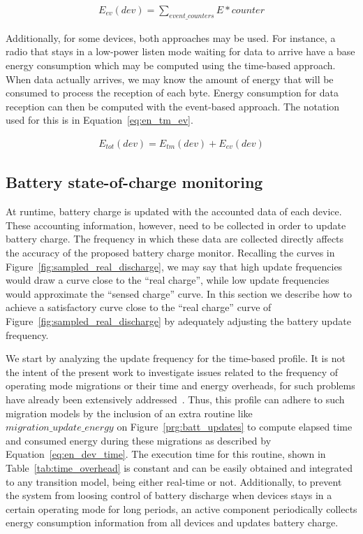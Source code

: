 \begin{eqnarray}
E_{ev}(dev) = \sum_{event\_counters} E * counter \label{eq:en_dev_ev}
\end{eqnarray}

Additionally, for some devices, both approaches may be used. For instance, a
radio that stays in a low-power listen mode waiting for data to arrive have a
base energy consumption which may be computed using the time-based approach.
When data actually arrives, we may know the amount of energy that will be
consumed to process the reception of each byte. Energy consumption for data
reception can then be computed with the event-based approach. The notation used
for this is in Equation~\ref{eq:en_tm_ev}.

\begin{eqnarray}
E_{tot}(dev) = E_{tm}(dev) + E_{ev}(dev) \label{eq:en_tm_ev}
\end{eqnarray}


\subsection{Battery state-of-charge monitoring}

At runtime, battery charge is updated with the accounted data of each device.
These accounting information, however, need to be collected in order to update
battery charge. The frequency in which these data are collected directly affects
the accuracy of the proposed battery charge monitor. Recalling the curves in
Figure~\ref{fig:sampled_real_discharge}, we may say that high update frequencies
would draw a curve close to the ``real charge'', while low update frequencies
would approximate the ``sensed charge'' curve. In this section we describe how
to achieve a satisfactory curve close to the ``real charge'' curve of
Figure~\ref{fig:sampled_real_discharge} by adequately adjusting the battery
update frequency.

We start by analyzing the update frequency for the time-based profile. It is not
the intent of the present work to investigate issues related to the frequency of
operating mode migrations or their time and energy overheads, for such problems
have already been extensively addressed~\cite{Hoeller:DIPES:2006,Seo:2011}.
Thus, this profile can adhere to such migration models by the inclusion of an
extra routine like $migration\_update\_energy$ on Figure~\ref{prg:batt_updates}
to compute elapsed time and consumed energy during these migrations as described
by Equation~\ref{eq:en_dev_time}. The execution time for this routine, shown in
Table~\ref{tab:time_overhead} is constant and can be easily obtained and
integrated to any transition model, being either real-time or not. Additionally,
to prevent the system from loosing control of battery discharge when devices
stays in a certain operating mode for long periods, an active component
periodically collects energy consumption information from all devices and
updates battery charge.

